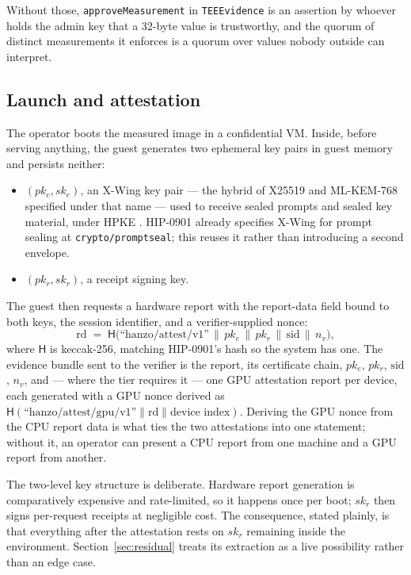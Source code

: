 \documentclass[11pt]{article}
\newcommand{\code}[1]{\texttt{#1}}
\begin{document}
Without those, \code{approveMeasurement} in \code{TEEEvidence} is an assertion by whoever holds the
admin key that a 32-byte value is trustworthy, and the quorum of distinct measurements it
enforces is a quorum over values nobody outside can interpret.

\subsection{Launch and attestation}

The operator boots the measured image in a confidential VM. Inside, before serving anything, the
guest generates two ephemeral key pairs in guest memory and persists neither:

\begin{itemize}[leftmargin=1.4em,itemsep=2pt]
\item $(pk_e, sk_e)$, an X-Wing key pair --- the hybrid of X25519 and ML-KEM-768 specified under
that name ---
used to receive sealed prompts and sealed key material, under HPKE \cite{hpke}. HIP-0901 already
specifies X-Wing for prompt sealing at \code{crypto/promptseal}; this reuses it rather than
introducing a second envelope.
\item $(pk_r, sk_r)$, a receipt signing key.
\end{itemize}

The guest then requests a hardware report with the report-data field bound to both keys, the session
identifier, and a verifier-supplied nonce:
\[
\mathrm{rd} \;=\; \mathsf{H}\big(\text{``hanzo/attest/v1''} \,\|\, pk_e \,\|\, pk_r \,\|\, \mathrm{sid} \,\|\, n_v\big),
\]
where $\mathsf{H}$ is keccak-256, matching HIP-0901's hash so the system has one. The evidence
bundle sent to the verifier is the report, its certificate chain, $pk_e$, $pk_r$, $\mathrm{sid}$,
$n_v$, and --- where the tier requires it --- one GPU attestation report per device, each generated
with a GPU nonce derived as $\mathsf{H}(\text{``hanzo/attest/gpu/v1''} \| \mathrm{rd} \| \text{device index})$.
Deriving the GPU nonce from the CPU report data is what ties the two attestations into one
statement; without it, an operator can present a CPU report from one machine and a GPU report from
another.

The two-level key structure is deliberate. Hardware report generation is comparatively expensive and
rate-limited, so it happens once per boot; $sk_r$ then signs per-request receipts at negligible
cost. The consequence, stated plainly, is that everything after the attestation rests on $sk_r$
remaining inside the environment. Section~\ref{sec:residual} treats its extraction as a live
possibility rather than an edge case.
\end{document}
